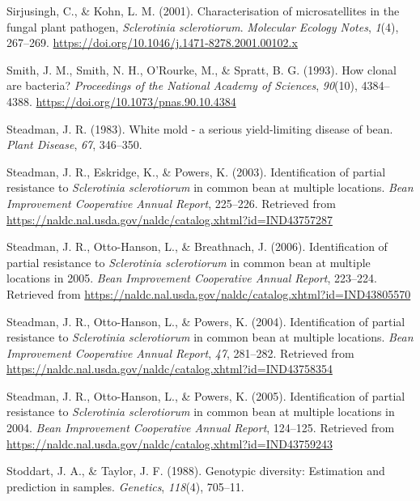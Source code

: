 \hypertarget{ref-sirjusingh2001characterisation}{}
Sirjusingh, C., \& Kohn, L. M. (2001). Characterisation of
microsatellites in the fungal plant pathogen, \emph{Sclerotinia
sclerotiorum}. \emph{Molecular Ecology Notes}, \emph{1}(4), 267--269.
\url{https://doi.org/10.1046/j.1471-8278.2001.00102.x}

\hypertarget{ref-smith1993how}{}
Smith, J. M., Smith, N. H., O'Rourke, M., \& Spratt, B. G. (1993). How
clonal are bacteria? \emph{Proceedings of the National Academy of
Sciences}, \emph{90}(10), 4384--4388.
\url{https://doi.org/10.1073/pnas.90.10.4384}

\hypertarget{ref-steadman1983white}{}
Steadman, J. R. (1983). White mold - a serious yield-limiting disease of
bean. \emph{Plant Disease}, \emph{67}, 346--350.

\hypertarget{ref-steadman2003identification}{}
Steadman, J. R., Eskridge, K., \& Powers, K. (2003). Identification of
partial resistance to \emph{Sclerotinia sclerotiorum} in common bean at
multiple locations. \emph{Bean Improvement Cooperative Annual Report},
225--226. Retrieved from
\url{https://naldc.nal.usda.gov/naldc/catalog.xhtml?id=IND43757287}

\hypertarget{ref-steadman2006identification}{}
Steadman, J. R., Otto-Hanson, L., \& Breathnach, J. (2006).
Identification of partial resistance to \emph{Sclerotinia sclerotiorum}
in common bean at multiple locations in 2005. \emph{Bean Improvement
Cooperative Annual Report}, 223--224. Retrieved from
\url{https://naldc.nal.usda.gov/naldc/catalog.xhtml?id=IND43805570}

\hypertarget{ref-steadman2004identification}{}
Steadman, J. R., Otto-Hanson, L., \& Powers, K. (2004). Identification
of partial resistance to \emph{Sclerotinia sclerotiorum} in common bean
at multiple locations. \emph{Bean Improvement Cooperative Annual
Report}, \emph{47}, 281--282. Retrieved from
\url{https://naldc.nal.usda.gov/naldc/catalog.xhtml?id=IND43758354}

\hypertarget{ref-steadman2005identification}{}
Steadman, J. R., Otto-Hanson, L., \& Powers, K. (2005). Identification
of partial resistance to \emph{Sclerotinia sclerotiorum} in common bean
at multiple locations in 2004. \emph{Bean Improvement Cooperative Annual
Report}, 124--125. Retrieved from
\url{https://naldc.nal.usda.gov/naldc/catalog.xhtml?id=IND43759243}

\hypertarget{ref-stoddart1988genotypic}{}
Stoddart, J. A., \& Taylor, J. F. (1988). Genotypic diversity:
Estimation and prediction in samples. \emph{Genetics}, \emph{118}(4),
705--11.


